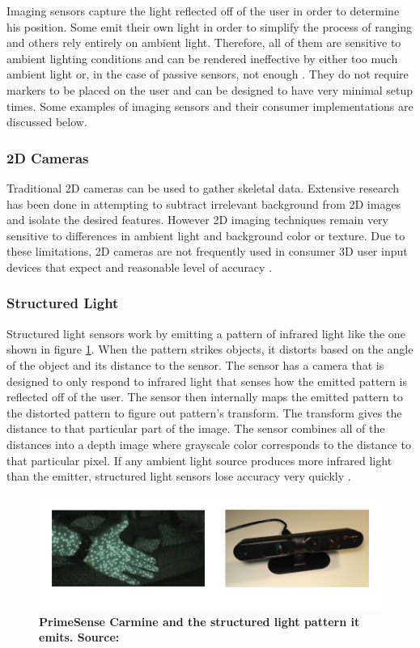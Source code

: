 Imaging sensors capture the light reflected off of the user in order to determine his position. Some emit their own light in order to simplify the process of ranging and others rely entirely on ambient light. Therefore, all of them are sensitive to ambient lighting conditions and can be rendered ineffective by either too much ambient light or, in the case of passive sensors, not enough \cite{besl1988active}. They do not require markers to be placed on the user and can be designed to have very minimal setup times. Some examples of imaging sensors and their consumer implementations are discussed below.

\subsubsection{2D Cameras}

Traditional 2D cameras can be used to gather skeletal data. Extensive research has been done in attempting to subtract irrelevant background from 2D images and isolate the desired features. However 2D imaging techniques remain very sensitive to differences in ambient light and background color or texture. Due to these limitations, 2D cameras are not frequently used in consumer 3D user input devices that expect and reasonable level of accuracy \cite{shimada2001real}.

\subsubsection{Structured Light}

Structured light sensors work by emitting a pattern of infrared light like the one shown in figure \ref{fig:carmine_light}. When the pattern strikes objects, it distorts based on the angle of the object and its distance to the sensor. The sensor has a camera that is designed to only respond to infrared light that senses how the emitted pattern is reflected off of the user. The sensor then internally maps the emitted pattern to the distorted pattern to figure out pattern’s transform. The transform gives the distance to that particular part of the image. The sensor combines all of the distances into a depth image where grayscale color corresponds to the distance to that particular pixel. If any ambient light source produces more infrared light than the emitter, structured light sensors lose accuracy very quickly \cite{scharstein2003high}.

\begin{figure}[]
\centering
\includegraphics[width=1\textwidth]{figures/carminePattern}
\caption{\textbf{PrimeSense Carmine and the structured light pattern it emits. Source: \cite{structured_pattern}}}
\label{fig:carmine_light}
\end{figure}

